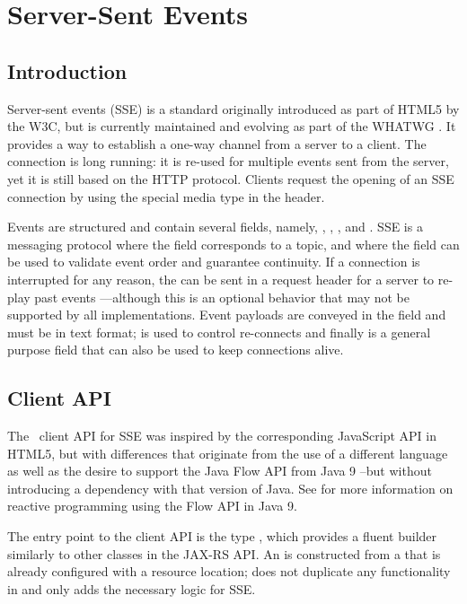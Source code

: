 \chapter{Server-Sent Events}

\section{Introduction}
\label{sse_introduction}

Server-sent events (SSE) is a standard originally introduced as part of HTML5 by the W3C, but is currently maintained and evolving as part of the WHATWG \cite{sse}. It provides a way to establish a one-way channel from a server to a client. The connection is long running: it is re-used for multiple events sent from the server, yet it is still based on the HTTP protocol. Clients request the opening of an SSE connection by using the special media type  in the  header.

Events are structured and contain several fields, namely, , , ,  and . SSE is a messaging protocol where the  field corresponds to a topic, and where the  field can be used to validate event order and guarantee continuity. If a connection is interrupted for any reason, the  can be sent in a request header for a server to re-play past events ---although this is an optional behavior that may not be supported by all implementations. Event payloads are conveyed in the  field and must be in text format;  is used to control re-connects and finally  is a general purpose field that can also be used to keep connections alive.

\section{Client API}
\label{sse_client_api}

The \jaxrs\ client API for SSE was inspired by the corresponding JavaScript API in HTML5, but with differences that originate from the use of a different language as well as the desire to support the Java Flow API from Java 9 --but without introducing a dependency with that version of Java. See \cite{java9flow} for more information on reactive programming using the Flow API in Java 9.

The entry point to the client API is the type , which provides a fluent builder similarly to other classes in the JAX-RS API. An  is constructed from a  that is already configured with a resource location;  does not duplicate any functionality in  and only adds the necessary logic for SSE. 

